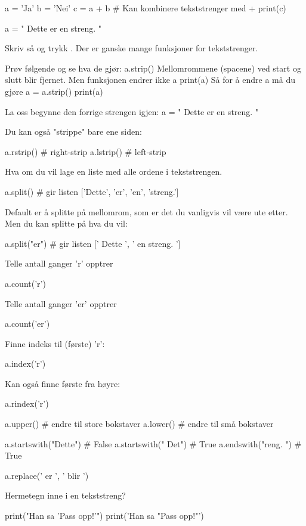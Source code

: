 \begin{usncodebox}
a = 'Ja'
b = 'Nei'
c = a + b    # Kan kombinere tekststrenger med +
print(c)

a = " Dette er en streng.  "
\end{usncodebox}

Skriv så  og trykk . Der er ganske mange funksjoner for tekststrenger.

Prøv følgende og se hva de gjør: 
a.strip()
Mellomrommene (spacene) ved start og slutt blir fjernet.
Men funksjonen endrer ikke a
print(a)
Så for å endre a må du gjøre 
a = a.strip() 
print(a)

La oss begynne den forrige strengen igjen: 
a = " Dette er en streng.  "

Du kan også "strippe" bare ene siden:
\begin{usncodebox}
a.rstrip()    # right-strip
a.lstrip()    # left-strip
\end{usncodebox}

Hva om du vil lage en liste med alle ordene i tekststrengen.
\begin{usncodebox}
a.split()       # gir listen ['Dette', 'er', 'en', 'streng.']
\end{usncodebox}

Default er å splitte på mellomrom, som er det du vanligvis vil være ute etter. Men du kan splitte på hva du vil:
\begin{usncodebox}
a.split("er")   # gir listen [' Dette ', ' en streng.  ']
\end{usncodebox}

Telle antall ganger 'r' opptrer
\begin{usncodebox}
a.count('r')
\end{usncodebox}

Telle antall ganger 'er' opptrer
\begin{usncodebox}
a.count('er')
\end{usncodebox}

Finne indeks til (første) 'r':
\begin{usncodebox}
a.index('r')
\end{usncodebox}

Kan også finne første fra høyre:
\begin{usncodebox}
a.rindex('r')

a.upper()  # endre til store bokstaver
a.lower()  # endre til små bokstaver

a.startswith("Dette")  # False
a.startswith(" Det")   # True
a.endswith("reng.  ")      # True

a.replace(' er ', ' blir ')
\end{usncodebox}


Hermetegn inne i en tekststreng?
\begin{usncodebox}
print("Han sa 'Pass opp!'")
print('Han sa "Pass opp!"')
\end{usncodebox}
